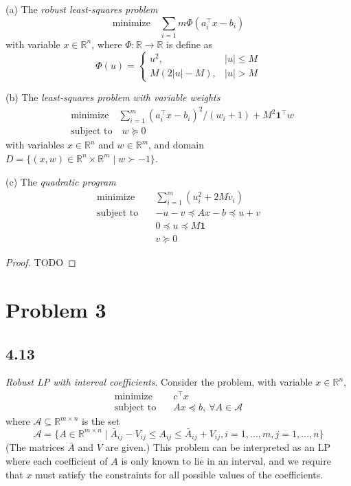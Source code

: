 \documentclass[11pt]{article}
\newcommand{\RR}{\mathbb{R}}
\newcommand{\T}{^\top}
\begin{document}
(a) The \textit{robust least-squares problem}
\[
\text{minimize}\quad \sum_{i=1}{m} \Phi(a\T_i x - b_i)
\]
with variable $x\in\RR^n$, where $\Phi:\RR \rightarrow \RR$ is define as
\[
  \Phi(u)= 
  \begin{cases}
    u^2, & |u| \leq M \\ 
    M (2|u| - M), & |u| > M
  \end{cases}
\]

(b) The \textit{least-squares problem with variable weights}
\begin{align*}
  &\text{minimize}\quad \sum_{i=1}^{m} (a\T_i x - b_i)^2 / (w_i + 1) + M^2 \mathbf{1}\T w\\
  &\text{subject to}\quad w\succeq 0
\end{align*}
with variables $x\in\RR^n$ and $w\in\RR^m$, and domain $D = \{(x, w) \in\RR^n\times \RR^m \mid w\succ -1\}$.


(c) The \textit{quadratic program}
\begin{align*}
  \text{minimize}\quad &\sum_{i=1}^{m}(u_i^2 + 2Mv_i)\\
  \text{subject to}\quad &-u -v \preceq Ax - b \preceq u+v\\
  & 0 \preceq u \preceq M \mathbf{1}\\
  & v \succeq 0
\end{align*}

\begin{proof}
  TODO
\end{proof}

\clearpage
\section*{Problem 3}
\subsection*{4.13}
\textit{Robust LP with interval coefficients}. Consider the problem, with variable $x\in\RR^n$,
\begin{align*}
  \text{minimize}\quad &c\T x\\
  \text{subject to}\quad & Ax\preceq b, \ \forall A\in \mathcal{A}
\end{align*}
where $\mathcal{A} \subseteq \RR^{m\times n}$ is the set
\[
\mathcal{A} = \{A\in \RR^{m\times n} \mid \bar A_{ij} - V_{ij} \leq A_{ij} \leq \bar A_{ij} + V_{ij}, i = 1, \dots, m, j = 1, \dots, n\}
\]
(The matrices $\bar A$ and $V$ are given.) This problem can be interpreted as an LP where each coefficient of $A$ is only known to lie in an interval, and we require that $x$ must satisfy the constraints for all possible values of the coefficients.
\end{document}
